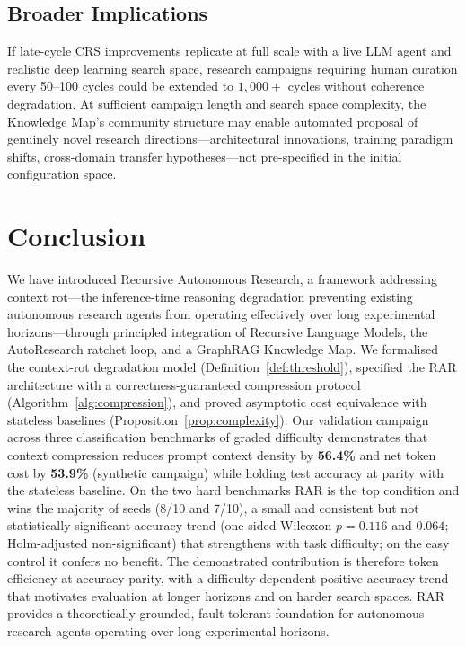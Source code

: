 \documentclass[conference]{IEEEtran}
\begin{document}
\subsection{Broader Implications}
If late-cycle CRS improvements replicate at full scale with a live LLM agent and realistic deep learning search space, research campaigns requiring human curation every 50--100 cycles could be extended to $1{,}000{+}$ cycles without coherence degradation. At sufficient campaign length and search space complexity, the Knowledge Map's community structure may enable automated proposal of genuinely novel research directions---architectural innovations, training paradigm shifts, cross-domain transfer hypotheses---not pre-specified in the initial configuration space.

\section{Conclusion}

We have introduced Recursive Autonomous Research, a framework addressing context rot---the inference-time reasoning degradation preventing existing autonomous research agents from operating effectively over long experimental horizons---through principled integration of Recursive Language Models, the AutoResearch ratchet loop, and a GraphRAG Knowledge Map. We formalised the context-rot degradation model (Definition~\ref{def:threshold}), specified the RAR architecture with a correctness-guaranteed compression protocol (Algorithm~\ref{alg:compression}), and proved asymptotic cost equivalence with stateless baselines (Proposition~\ref{prop:complexity}). Our validation campaign across three classification benchmarks of graded difficulty demonstrates that context compression reduces prompt context density by \textbf{56.4\%} and net token cost by \textbf{53.9\%} (synthetic campaign) while holding test accuracy at parity with the stateless baseline. On the two hard benchmarks RAR is the top condition and wins the majority of seeds (8/10 and 7/10), a small and consistent but not statistically significant accuracy trend (one-sided Wilcoxon $p = 0.116$ and $0.064$; Holm-adjusted non-significant) that strengthens with task difficulty; on the easy control it confers no benefit. The demonstrated contribution is therefore token efficiency at accuracy parity, with a difficulty-dependent positive accuracy trend that motivates evaluation at longer horizons and on harder search spaces. RAR provides a theoretically grounded, fault-tolerant foundation for autonomous research agents operating over long experimental horizons.
\end{document}
